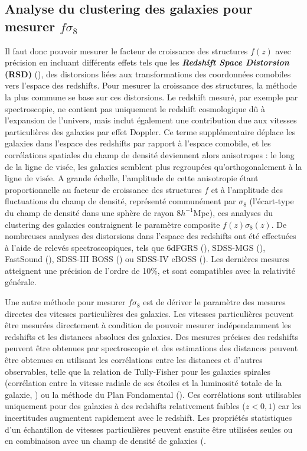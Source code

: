 \documentclass{book}
\begin{document}
\subsection{Analyse du clustering des galaxies pour mesurer $f\sigma_8$}

Il faut donc pouvoir mesurer le facteur de croissance des structures $f(z)$ avec précision en incluant différents effets tels que les \textbf{\textit{Redshift Space Distorsion} (RSD)} (\cite{kaiser_clustering_1987}), des distorsions liées aux transformations des coordonnées comobiles vers l'espace des redshifts. Pour mesurer la croissance des structures, la méthode la plus commune se base sur ces distorsions. Le redshift mesuré, par exemple par spectroscopie, ne contient pas uniquement le redshift cosmologique dû à l'expansion de l'univers, mais inclut également une contribution due aux vitesses particulières des galaxies par effet  Doppler.
Ce terme supplémentaire déplace les galaxies dans l'espace des redshifts par rapport à l'espace comobile, et les corrélations spatiales du champ de densité deviennent alors anisotropes : le long de la ligne de visée, les galaxies semblent plus regroupées qu'orthogonalement à la ligne de visée. A grande échelle, l'amplitude de cette anisotropie étant proportionnelle au facteur de croissance des structures $f$ et à l'amplitude des fluctuations du champ de densité, représenté communément par $\sigma_8$ (l'écart-type du champ de densité dans une sphère de rayon 8$h^{-1}$Mpc), ces analyses du clustering des galaxies contraignent le paramètre composite $f(z)\sigma_8(z)$. De nombreuses analyses des distorsions dans l'espace des redshifts ont été effectuées à l'aide de relevés spectroscopiques, tels que 6dFGRS (\cite{beutler_6df_2012}), SDSS-MGS (\cite{howlett_clustering_2015}), FastSound (\cite{okumura_subaru_2016}), SDSS-III BOSS (\cite{alam_clustering_2017}) ou SDSS-IV eBOSS (\cite{eboss_collaboration_completed_2021}). Les dernières mesures atteignent une précision de l'ordre de 10\%, et sont compatibles avec la relativité générale.

Une autre méthode pour mesurer $f\sigma_8$ est de dériver le paramètre des mesures directes des vitesses particulières des galaxies. Les vitesses particulières peuvent être mesurées directement à condition de pouvoir mesurer indépendamment les redshifts et les distances absolues des galaxies. Des mesures précises des redshifts peuvent être obtenues par spectroscopie et des estimations des distances peuvent être obtenues en utilisant les corrélations entre les distances et d'autres observables, telle que la relation de Tully-Fisher pour les galaxies spirales (corrélation entre la vitesse radiale de ses étoiles et la luminosité totale de la galaxie, \cite{tully_new_1977}) ou la méthode du Plan Fondamental (\cite{djorgovski_fundamental_1987}). Ces corrélations sont utilisables uniquement pour des galaxies à des redshifts relativement faibles ($z < 0,1$) car les incertitudes augmentent rapidement avec le redshift. Les propriétés statistiques d'un échantillon de vitesses particulières peuvent ensuite être utilisées seules ou en combinaison avec un champ de densité de galaxies (\cite{adams_joint_2020, qin_redshift_2019, turner_local_2023}.
\end{document}

